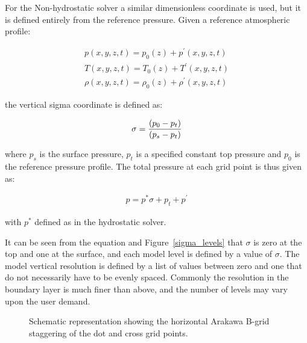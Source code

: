 For the Non-hydrostatic solver a similar dimensionless coordinate is used,
but it is defined entirely from the reference pressure. Given a reference
atmospheric profile:

\begin{eqnarray}
  p(x,y,z,t) = p_0(z) + p^\prime(x,y,z,t) \\
  T(x,y,z,t) = T_0(z) + T^\prime(x,y,z,t) \\
  \rho(x,y,z,t) = \rho_0(z) + \rho^\prime(x,y,z,t)
\end{eqnarray}

the vertical sigma coordinate is defined as:

\begin{eqnarray}
  \sigma = {(p_0 - p_t) \over (p_s - p_t)}
\end{eqnarray}

where $p_s$ is the surface pressure, $p_t$ is a specified constant top
pressure and $p_0$ is the reference pressure profile. The total pressure
at each grid point is thus given as:

\begin{eqnarray}
 p = p^*\sigma + p_t + p^\prime
\end{eqnarray}

with $p^*$ defined as in the hydrostatic solver.

It can be seen from the equation and Figure~\ref{sigma_levels} that $\sigma$ is
zero at the top and one at the surface, and each model level is defined by a
value of $\sigma$. The model vertical resolution is defined by a list of values
between zero and one that do not necessarily have to be evenly spaced. Commonly
the resolution in the boundary layer is much finer than above, and the number of
levels may vary upon the user demand.

\begin{figure}
\begin{center}
\caption{Schematic representation showing the horizontal Arakawa B-grid
staggering of the dot and cross grid points.}
\label{grid}
\end{center}
\end{figure}

